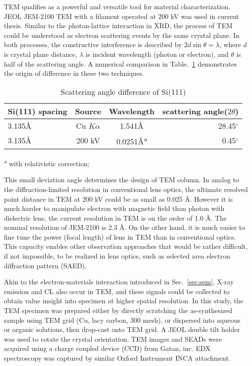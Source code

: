 TEM qualifies as a powerful and versatile tool for material characterization. JEOL JEM-2100 TEM with a  filament operated at 200 kV was used in current thesis. Similar to the photon-lattice interaction in XRD, the process of TEM could be understood as electron scattering events by the same crystal plane. In both processes, the constructive interference is described by $2d\sin\theta = \lambda$, where $d$ is crystal plane distance, $\lambda$ is incident wavelength (photon or electron), and $\theta$ is half of the scattering angle. A numerical comparison in Table.~\ref{tab:ch2tem} demonstrates the origin of difference in these two techniques. 

\begin{table}[htb]
\centering
\caption{Scattering angle difference of Si(111)}\label{tab:ch2tem}
\begin{tabular}{lccr}
\toprule
Si(111) spacing & Source & Wavelength & scattering angle($2\theta$) \\
\midrule
3.135\AA & Cu $K\alpha$ & 1.541\AA & 28.45$^\circ$  \\
3.135\AA & 200 kV & 0.0251\AA \textsuperscript{\emph{a}}& 0.45$^\circ$  \\
\bottomrule
\end{tabular}

 \textsuperscript{\emph{a}} with relativistic correction;
\end{table}

This small deviation angle determines the design of TEM column. In analog to the diffraction-limited resolution in conventional lens optics, the ultimate resolved point distance in TEM at 200 kV could be as small as 0.025 \AA. However it is much harder to manipulate electron with magnetic field than photon with dielectric lens, the current resolution in TEM is on the order of 1.0 \AA. The nominal resolution of JEM-2100 is 2.3 \AA. On the other hand, it is much easier to fine tune the power (focal length) of lens in TEM than in conventional optics. This capacity enables other observation approaches that would be rather difficult, if not impossible, to be realized in lens optics, such as selected area electron diffraction pattern (SAED). 

Akin to the electron-materials interaction introduced in Sec.~\ref{sec:sem}, X-ray emission and CL also occur in TEM, and these signals could be collected to obtain value insight into specimen at higher spatial resolution. In this study, the TEM specimen was prepared either by directly scratching the as-synthesized sample using TEM grid (Cu, lacy carbon, 300 mesh), or dispersed into aqueous or organic solutions, then drop-cast onto TEM grid. A JEOL double tilt holder was used to rotate the crystal orientation. TEM images and SEADs were acquired using a charge coupled device (CCD) from Gatan, inc. EDX spectroscopy was captured by similar Oxford Instrument INCA attachment. 


